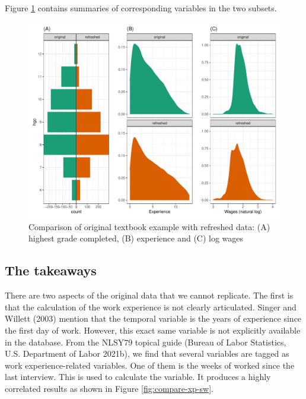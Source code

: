 \documentclass{article}
\begin{document}
Figure \ref{fig:compare-subsets} contains summaries of corresponding variables in the two subsets.

\begin{figure}

{\centering \includegraphics[width=1\linewidth]{figures/compare-subsets-1} 

}

\caption{Comparison of original textbook example with refreshed data: (A) highest grade completed, (B) experience and (C) log wages}\label{fig:compare-subsets}
\end{figure}

\hypertarget{takeaways}{%
\subsection{The takeaways}\label{takeaways}}

There are two aspects of the original data that we cannot replicate. The first is that the calculation of the work experience is not clearly articulated. Singer and Willett (2003) mention that the temporal variable is the years of experience since the first day of work. However, this exact same variable is not explicitly available in the database. From the NLSY79 topical guide (Bureau of Labor Statistics, U.S. Department of Labor 2021b), we find that several variables are tagged as work experience-related variables. One of them is the weeks of worked since the last interview. This is used to calculate the variable. It produces a highly correlated results as shown in Figure \ref{fig:compare-xp-sw}.
\end{document}
